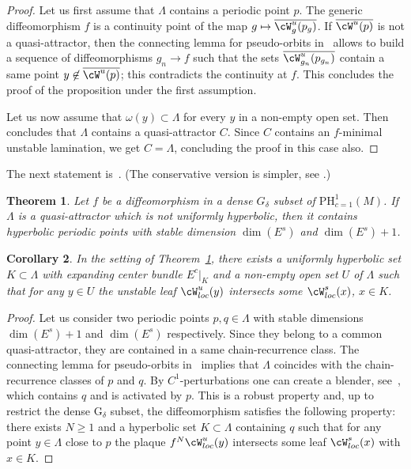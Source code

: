 \documentclass[a4paper,11pt]{amsart}
\numberwithin{equation}{section}     %
\newtheorem{teo}{Theorem}[section]
\newtheorem{cor}[teo]{Corollary}
\theoremstyle{definition}
\theoremstyle{remark}
\begin{document}
\begin{proof}
Let us first assume that $\Lambda$ contains a periodic point $p$.
The generic diffeomorphism $f$ is a continuity point of the map
$g \mapsto \overline{\cW^u_g(p_g)}$. If $\overline{\cW^u(p)}$ is not a quasi-attractor, then the connecting lemma for pseudo-orbits in~\cite{BC-rec} allows to build a sequence of diffeomorphisms $g_n\to f$ such that the sets $\overline{\cW^u_{g_n}(p_{g_n})}$
contain a same point $y\not\in \overline{\cW^u(p)}$; this contradicts the continuity at $f$.
This concludes the proof of the proposition under the first assumption.

Let us now assume that $\omega(y) \subset \Lambda$ for every $y$ in a non-empty open set. Then \cite[Corollaire 1.8]{BC-rec} concludes that $\Lambda$ contains a quasi-attractor $C$.
Since $C$ contains an $f$-minimal unstable lamination, we get $C=\Lambda$, concluding the proof in this case also.
\end{proof}

The next statement is~\cite[Theorem 15]{CP}. (The conservative version is simpler, see \cite{BC-rec}.)
\begin{teo}\label{t.palis}
Let $f$ be a diffeomorphism in a dense $G_\delta$ subset of $\mathrm{PH}^1_{c=1}(M)$. If $\Lambda$ is a quasi-attractor which is not uniformly hyperbolic, then it contains hyperbolic periodic points with stable dimension $\dim(E^s)$ and $\dim(E^s)+1$.
\end{teo}

\begin{cor}\label{c.palis}
In the setting of Theorem~\ref{t.palis}, there exists a uniformly hyperbolic set $K\subset \Lambda$ with expanding center bundle $E^c|_K$ and a non-empty open set $U$ of $\Lambda$ such that for any $y\in U$ the unstable leaf $\cW^u_{loc}(y)$ intersects
some $\cW^s_{loc}(x)$, $x\in K$.
\end{cor}
\begin{proof}
Let us consider two periodic points $p,q\in \Lambda$ with stable dimensions $\dim(E^s)+1$ and $\dim(E^s)$ respectively.
Since they belong to a common quasi-attractor, they are contained in a same chain-recurrence class.
The connecting lemma for pseudo-orbits in~\cite{BC-rec} implies that $\Lambda$ coincides with the chain-recurrence classes of $p$ and $q$. By $C^1$-perturbations one can create a blender, see~\cite[Section 6.2]{BDV}, which contains $q$ and is activated by $p$. This is a robust property and, up to restrict the dense G$_\delta$ subset, the diffeomorphism satisfies the following property: there exists $N\geq 1$ and a hyperbolic set $K\subset \Lambda$ containing $q$ such that for any point $y\in \Lambda$ close to $p$ the plaque $f^N\cW^u_{loc}(y)$ intersects some leaf $\cW^s_{loc}(x)$ with $x\in K$.
\end{proof}
\end{document}

